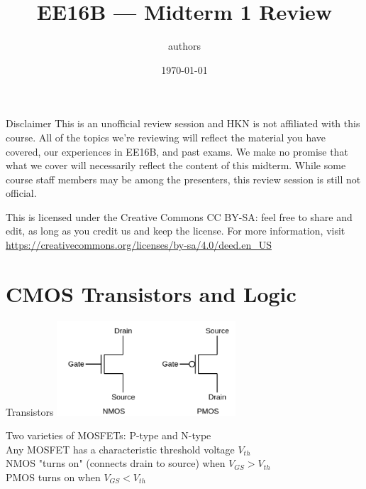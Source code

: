 \documentclass{beamer}
\title{EE16B --- Midterm 1 Review}
\author{authors}
\institute{Presented by: }
\date{\today}
\begin{document}
    \section{}
	\begin{frame}
		\titlepage
	\end{frame}

	\begin{frame}{Disclaimer}
	This is an unofficial review session and HKN is not affiliated with this course. All of the topics we're reviewing will reflect the material you have covered, our experiences in EE16B, and past exams. We make no promise that what we cover will necessarily reflect the content of this midterm. While some course staff members may be among the presenters, this review session is still not official.
	\vspace{1em}
	
	This is licensed under the Creative Commons CC BY-SA: feel free to share and edit, as long as you credit us and keep the license. For more information, visit \\ \small{\url{https://creativecommons.org/licenses/by-sa/4.0/deed.en_US}}
	
	\end{frame}
	
	\section{CMOS Transistors and Logic}
	
	\begin{frame}{Transistors}
	    \includegraphics[width=0.5\textwidth]{mos.png}
	    
	    Two varieties of MOSFETs: P-type and N-type
	    \\
	    Any MOSFET has a characteristic threshold voltage $V_{th}$
	    \\
	    NMOS "turns on" (connects drain to source) when $V_{GS}>V_{th}$
	    \\
	    PMOS turns on when $V_{GS}<V_{th}$
	\end{frame}
	
\end{document}
